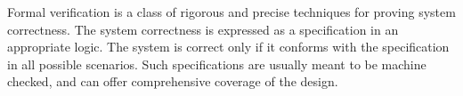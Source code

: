 Formal verification is a class of rigorous and precise techniques for
proving system correctness.
The system correctness is expressed as a specification in an
appropriate logic.
The system is correct only if it conforms with the specification in
all possible scenarios.
Such specifications are usually meant to be machine checked, and
can offer comprehensive coverage of the design.

